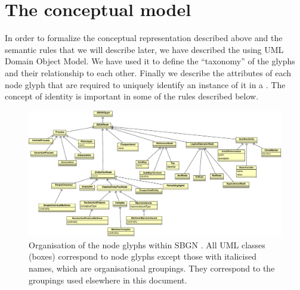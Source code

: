 
\section{The conceptual model}
\label{sec:conceptual-model}

In order to formalize the conceptual representation described above and the semantic rules that we will describe later, we have described the \PDl using UML Domain Object Model. We have used it to define the ``taxonomy'' of the \PD glyphs and their relationship to each other. Finally we describe the attributes of each node glyph that are required to uniquely identify an instance of it in a \PDm. The concept of identity is important in some of the rules described below.

\begin{figure}[htb]
\begin{center}
\includegraphics[width=\linewidth]{images/sbgn_node_taxonomy}
\caption{Organisation of the node glyphs within SBGN \PDl. All UML classes (boxes) correspond to \PD node glyphs except those with italicised names, which are organisational groupings. They correspond to the groupings used elsewhere in this document.}
\label{fig:sbgn_node_tax}
\end{center}
\end{figure}

